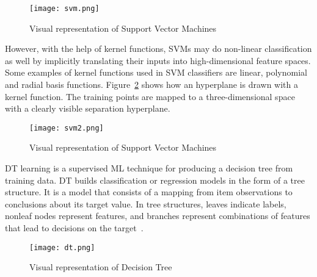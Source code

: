 \begin{figure}[htbp]
    \centering
    \texttt{[image: svm.png]}
    \caption{Visual representation of Support Vector Machines~\cite{MaquinaExplicada}}
    \label{fig:svm}
\end{figure}

However, with the help of kernel functions, \gls{SVM}s may do non-linear classification as well by implicitly translating their inputs into high-dimensional feature spaces. Some examples of kernel functions used in \gls{SVM} classifiers are linear, polynomial and radial basis functions. Figure~\ref{fig:svm2} shows how an hyperplane is drawn with a kernel function. The training points are mapped to a three-dimensional space with a clearly visible separation hyperplane.

\begin{figure}[htbp]
    \centering
    \texttt{[image: svm2.png]}
    \caption{Visual representation of Support Vector Machines~\cite{KernelWikipedia}}
    \label{fig:svm2}
\end{figure}

\gls{DT} learning is a supervised \gls{ML} technique for producing a decision tree from training data. \gls{DT} builds classification or regression models in the form of a tree structure. It is a model that consists of a mapping from item observations to conclusions about its target value. In tree structures, leaves indicate labels, nonleaf nodes represent features, and branches represent combinations of features that lead to decisions on the target~\cite{Tan2015CodeQuality}.

\begin{figure}[htbp]
    \centering
    \texttt{[image: dt.png]}
    \caption{Visual representation of Decision Tree~\cite{Rai2018XGBoostScience}}
    \label{fig:dt}
\end{figure}

